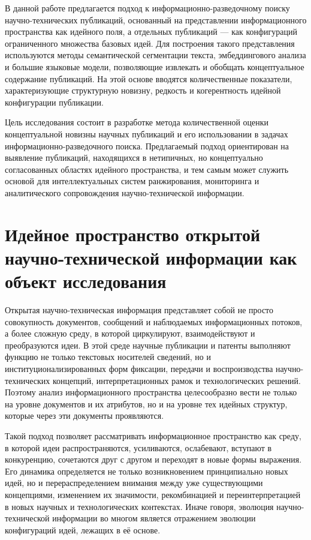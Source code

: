 \documentclass[review,3p,times]{elsarticle}
\begin{document}
В данной работе предлагается подход к информационно-разведочному поиску научно-технических публикаций, основанный на представлении информационного пространства как идейного поля, а отдельных публикаций — как конфигураций ограниченного множества базовых идей. Для построения такого представления используются методы семантической сегментации текста, эмбеддингового анализа и большие языковые модели, позволяющие извлекать и обобщать концептуальное содержание публикаций. На этой основе вводятся количественные показатели, характеризующие структурную новизну, редкость и когерентность идейной конфигурации публикации.

Цель исследования состоит в разработке метода количественной оценки концептуальной новизны научных публикаций и его использовании в задачах информационно-разведочного поиска. Предлагаемый подход ориентирован на выявление публикаций, находящихся в нетипичных, но концептуально согласованных областях идейного пространства, и тем самым может служить основой для интеллектуальных систем ранжирования, мониторинга и аналитического сопровождения научно-технической информации.



\section{Идейное пространство открытой научно-технической информации как объект исследования}

Открытая научно-техническая информация представляет собой не просто совокупность документов, сообщений и наблюдаемых информационных потоков, а более сложную среду, в которой циркулируют, взаимодействуют и преобразуются идеи. В этой среде научные публикации и патенты выполняют функцию не только текстовых носителей сведений, но и институционализированных форм фиксации, передачи и воспроизводства научно-технических концепций, интерпретационных рамок и технологических решений. Поэтому анализ информационного пространства целесообразно вести не только на уровне документов и их атрибутов, но и на уровне тех идейных структур, которые через эти документы проявляются.

Такой подход позволяет рассматривать информационное пространство как среду, в которой идеи распространяются, усиливаются, ослабевают, вступают в конкуренцию, сочетаются друг с другом и переходят в новые формы выражения. Его динамика определяется не только возникновением принципиально новых идей, но и перераспределением внимания между уже существующими концепциями, изменением их значимости, рекомбинацией и переинтерпретацией в новых научных и технологических контекстах. Иначе говоря, эволюция научно-технической информации во многом является отражением эволюции конфигураций идей, лежащих в её основе.
\end{document}
